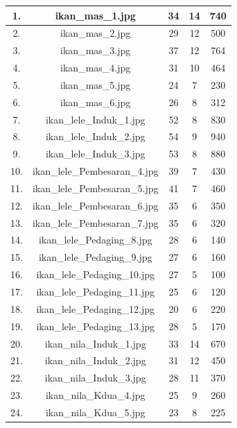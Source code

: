 \begin{longtable}{|c|c|c|c|c|}
        1. & ikan\_mas\_1.jpg & 34 & 14 & 740 \\
        \hline
        2. & ikan\_mas\_2.jpg & 29 & 12 & 500 \\
        \hline
        3. & ikan\_mas\_3.jpg & 37 & 12 & 764 \\
        \hline
        4. & ikan\_mas\_4.jpg & 31 &  10 & 464 \\
        \hline
        5. & ikan\_mas\_5.jpg & 24 & 7 & 230 \\
        \hline
        6. & ikan\_mas\_6.jpg & 26 & 8 & 312 \\
        \hline
        7. & ikan\_lele\_Induk\_1.jpg & 52 & 8 & 830 \\
        \hline
        8. & ikan\_lele\_Induk\_2.jpg & 54 & 9 & 940 \\
        \hline
        9. & ikan\_lele\_Induk\_3.jpg & 53 & 8 & 880 \\
        \hline
        10. & ikan\_lele\_Pembesaran\_4.jpg & 39 & 7 & 430 \\
        \hline
        11. & ikan\_lele\_Pembesaran\_5.jpg & 41 & 7 & 460 \\
        \hline
        12. & ikan\_lele\_Pembesaran\_6.jpg & 35 & 6 & 350 \\
        \hline
        13. & ikan\_lele\_Pembesaran\_7.jpg & 35 & 6 & 320 \\
        \hline
        14. & ikan\_lele\_Pedaging\_8.jpg & 28 & 6 & 140 \\
        \hline
        15. & ikan\_lele\_Pedaging\_9.jpg & 27 & 6 & 160 \\
        \hline
        16. & ikan\_lele\_Pedaging\_10.jpg & 27 & 5 & 100 \\
        \hline
        17. & ikan\_lele\_Pedaging\_11.jpg & 25 & 6 & 120 \\
        \hline
        18. & ikan\_lele\_Pedaging\_12.jpg & 20 & 6 & 220 \\
        \hline
        19. & ikan\_lele\_Pedaging\_13.jpg & 28 & 5 & 170 \\
        \hline
        20. & ikan\_nila\_Induk\_1.jpg & 33 & 14 & 670 \\
        \hline
        21. & ikan\_nila\_Induk\_2.jpg & 31 & 12 & 450 \\
        \hline
        22. & ikan\_nila\_Induk\_3.jpg & 28 & 11  &  370 \\
        \hline
        23. & ikan\_nila\_Kdua\_4.jpg & 25 & 9 & 260 \\
        \hline
        24. & ikan\_nila\_Kdua\_5.jpg & 23 & 8 & 225 \\

\end{longtable}
